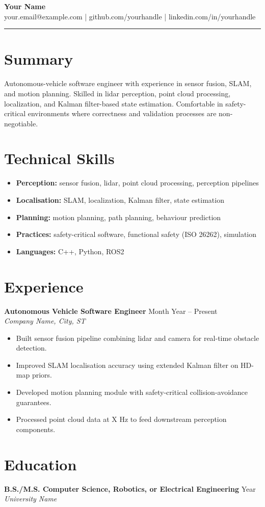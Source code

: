 \documentclass[11pt,letterpaper]{article}
\begin{document}
{\Large \textbf{Your Name}} \\
your.email@example.com \quad | \quad github.com/yourhandle \quad | \quad linkedin.com/in/yourhandle

\bigskip
\hrule
\bigskip

\section*{Summary}
Autonomous-vehicle software engineer with experience in sensor fusion, SLAM, and motion planning.
Skilled in lidar perception, point cloud processing, localization, and Kalman filter-based
state estimation. Comfortable in safety-critical environments where correctness and
validation processes are non-negotiable.

\section*{Technical Skills}
\begin{itemize}[leftmargin=*]
  \item \textbf{Perception:} sensor fusion, lidar, point cloud processing, perception pipelines
  \item \textbf{Localisation:} SLAM, localization, Kalman filter, state estimation
  \item \textbf{Planning:} motion planning, path planning, behaviour prediction
  \item \textbf{Practices:} safety-critical software, functional safety (ISO 26262), simulation
  \item \textbf{Languages:} C++, Python, ROS2
\end{itemize}

\section*{Experience}

\textbf{Autonomous Vehicle Software Engineer} \hfill Month Year -- Present \\
\textit{Company Name, City, ST}
\begin{itemize}[leftmargin=*]
  \item Built sensor fusion pipeline combining lidar and camera for real-time obstacle detection.
  \item Improved SLAM localisation accuracy using extended Kalman filter on HD-map priors.
  \item Developed motion planning module with safety-critical collision-avoidance guarantees.
  \item Processed point cloud data at X Hz to feed downstream perception components.
\end{itemize}

\section*{Education}
\textbf{B.S./M.S. Computer Science, Robotics, or Electrical Engineering} \hfill Year \\
\textit{University Name}
\end{document}
